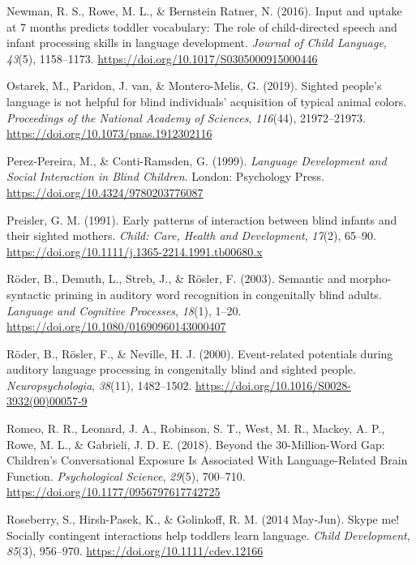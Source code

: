 \documentclass[
  man,floatsintext]{apa6}
\newlength{\cslhangindent}
\newlength{\cslentryspacingunit} %
\newenvironment{CSLReferences}[2] %
 {%
  \setlength{\parindent}{0pt}
  \ifodd #1
  \let\oldpar\par
  \def\par{\hangindent=\cslhangindent\oldpar}
  \fi
  \setlength{\parskip}{#2\cslentryspacingunit}
 }%
 {}
\begin{document}
\begin{CSLReferences}{1}{0}
\leavevmode{}%
Newman, R. S., Rowe, M. L., \& Bernstein Ratner, N. (2016). Input and uptake at 7 months predicts toddler vocabulary: The role of child-directed speech and infant processing skills in language development. \emph{Journal of Child Language}, \emph{43}(5), 1158--1173. \url{https://doi.org/10.1017/S0305000915000446}

\leavevmode{}%
Ostarek, M., Paridon, J. van, \& Montero-Melis, G. (2019). Sighted people's language is not helpful for blind individuals' acquisition of typical animal colors. \emph{Proceedings of the National Academy of Sciences}, \emph{116}(44), 21972--21973. \url{https://doi.org/10.1073/pnas.1912302116}

\leavevmode{}%
Perez-Pereira, M., \& Conti-Ramsden, G. (1999). \emph{Language {Development} and {Social Interaction} in {Blind Children}}. {London}: {Psychology Press}. \url{https://doi.org/10.4324/9780203776087}

\leavevmode{}%
Preisler, G. M. (1991). Early patterns of interaction between blind infants and their sighted mothers. \emph{Child: Care, Health and Development}, \emph{17}(2), 65--90. \url{https://doi.org/10.1111/j.1365-2214.1991.tb00680.x}

\leavevmode{}%
Röder, B., Demuth, L., Streb, J., \& Rösler, F. (2003). Semantic and morpho-syntactic priming in auditory word recognition in congenitally blind adults. \emph{Language and Cognitive Processes}, \emph{18}(1), 1--20. \url{https://doi.org/10.1080/01690960143000407}

\leavevmode{}%
Röder, B., Rösler, F., \& Neville, H. J. (2000). Event-related potentials during auditory language processing in congenitally blind and sighted people. \emph{Neuropsychologia}, \emph{38}(11), 1482--1502. \url{https://doi.org/10.1016/S0028-3932(00)00057-9}

\leavevmode{}%
Romeo, R. R., Leonard, J. A., Robinson, S. T., West, M. R., Mackey, A. P., Rowe, M. L., \& Gabrieli, J. D. E. (2018). Beyond the 30-{Million-Word Gap}: {Children}'s {Conversational Exposure Is Associated With Language-Related Brain Function}. \emph{Psychological Science}, \emph{29}(5), 700--710. \url{https://doi.org/10.1177/0956797617742725}

\leavevmode{}%
Roseberry, S., Hirsh-Pasek, K., \& Golinkoff, R. M. (2014 May-Jun). Skype me! {Socially} contingent interactions help toddlers learn language. \emph{Child Development}, \emph{85}(3), 956--970. \url{https://doi.org/10.1111/cdev.12166}


\end{CSLReferences}
\end{document}
